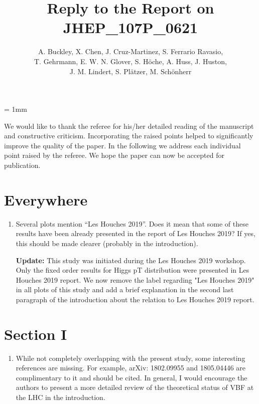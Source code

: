 \documentclass[12pt]{article}
\begin{document}
\unitlength = 1mm
\title{Reply to the Report on JHEP\_107P\_0621}
\author{A. Buckley, X. Chen, J. Cruz-Martinez, S. Ferrario Ravasio,\\ T. Gehrmann, E. W. N. Glover, S. H{\"o}che, A. Huss, J. Huston,\\ J. M. Lindert, S. Pl{\"a}tzer, M. Sch{\"o}nherr}
\date{}
\maketitle

We would like to thank the referee for his/her detailed reading of the manuscript and constructive criticism. Incorporating the raised points helped to significantly improve the quality of the paper.
In the following we address each individual point raised by the referee. We hope the paper can now be accepted for publication.

\section*{Everywhere}
\begin{enumerate}
	\item Several plots mention “Les Houches 2019”. Does it mean that some of these results have been already presented in the report of Les Houches 2019? If yes, this should be made clearer (probably in the introduction).

{\bf Update:} This study was initiated during the Les Houches 2019 workshop. Only the fixed order results for Higgs pT distribution were presented in Les Houches 2019 report. We now remove the label regarding "Les Houches 2019" in all plots of this study and add a brief explanation in the second last paragraph of the introduction about the relation to Les Houches 2019 report. 
\end{enumerate}

\section*{Section I}
\begin{enumerate}
\item While not completely overlapping with the present study, some interesting references are missing. For example, arXiv: 1802.09955 and 1805.04446 are complimentary to it and should be cited. In general, I would encourage the authors to present a more detailed review of the theoretical status of VBF at the LHC in the introduction.
\end{enumerate}
\end{document}
